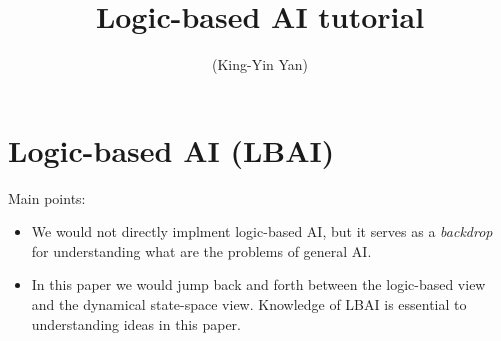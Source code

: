 \documentclass[orivec]{llncs}
\title{Logic-based AI tutorial}
\author{\usebox{\MyName} (King-Yin Yan)
}
\institute{General.Intelligence@Gmail.com}
\begin{document}
\maketitle

\setlength{\parindent}{0em}
\setlength{\parskip}{2.8ex plus0.8ex minus0.8ex}

\begin{abstract}
\end{abstract}

\setcounter{section}{-1}
\section{Logic-based AI (LBAI)}

Main points:
\begin{itemize}
\item We would not directly implment logic-based AI, but it serves as a \textit{backdrop} for understanding what are the problems of general AI.
\item In this paper we would jump back and forth between the logic-based view and the dynamical state-space view.  Knowledge of LBAI is essential to understanding ideas in this paper.
\end{itemize}

\end{document}
